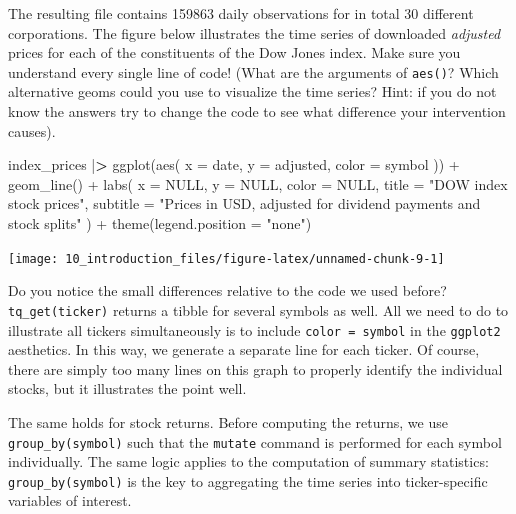 \documentclass[
]{krantz}
\newenvironment{Shaded}{\begin{snugshade}}{\end{snugshade}}
\newcommand{\AttributeTok}[1]{\textcolor[rgb]{0.61,0.61,0.61}{#1}}
\newcommand{\ConstantTok}[1]{\textcolor[rgb]{0,0,0}{#1}}
\newcommand{\ErrorTok}[1]{\textcolor[rgb]{0.14,0.14,0.14}{\textbf{#1}}}
\newcommand{\FunctionTok}[1]{\textcolor[rgb]{0,0,0}{#1}}
\newcommand{\NormalTok}[1]{#1}
\newcommand{\SpecialCharTok}[1]{\textcolor[rgb]{0,0,0}{#1}}
\newcommand{\StringTok}[1]{\textcolor[rgb]{0.5,0.5,0.5}{#1}}
\begin{document}
The resulting file contains 159863 daily observations for in total 30 different corporations. The figure below illustrates the time series of downloaded \emph{adjusted} prices for each of the constituents of the Dow Jones index. Make sure you understand every single line of code! (What are the arguments of \texttt{aes()}? Which alternative geoms could you use to visualize the time series? Hint: if you do not know the answers try to change the code to see what difference your intervention causes).

\begin{Shaded}
\begin{Highlighting}[]
\NormalTok{index\_prices }\SpecialCharTok{|}\ErrorTok{\textgreater{}}
  \FunctionTok{ggplot}\NormalTok{(}\FunctionTok{aes}\NormalTok{(}
    \AttributeTok{x =}\NormalTok{ date,}
    \AttributeTok{y =}\NormalTok{ adjusted,}
    \AttributeTok{color =}\NormalTok{ symbol}
\NormalTok{  )) }\SpecialCharTok{+}
  \FunctionTok{geom\_line}\NormalTok{() }\SpecialCharTok{+}
  \FunctionTok{labs}\NormalTok{(}
    \AttributeTok{x =} \ConstantTok{NULL}\NormalTok{,}
    \AttributeTok{y =} \ConstantTok{NULL}\NormalTok{,}
    \AttributeTok{color =} \ConstantTok{NULL}\NormalTok{,}
    \AttributeTok{title =} \StringTok{"DOW index stock prices"}\NormalTok{,}
    \AttributeTok{subtitle =} \StringTok{"Prices in USD, adjusted for dividend payments and stock splits"}
\NormalTok{  ) }\SpecialCharTok{+}
  \FunctionTok{theme}\NormalTok{(}\AttributeTok{legend.position =} \StringTok{"none"}\NormalTok{)}
\end{Highlighting}
\end{Shaded}

\begin{center}\texttt{[image: 10\_introduction\_files/figure-latex/unnamed-chunk-9-1]} \end{center}

Do you notice the small differences relative to the code we used before? \texttt{tq\_get(ticker)} returns a tibble for several symbols as well. All we need to do to illustrate all tickers simultaneously is to include \texttt{color\ =\ symbol} in the \texttt{ggplot2} aesthetics. In this way, we generate a separate line for each ticker. Of course, there are simply too many lines on this graph to properly identify the individual stocks, but it illustrates the point well.

The same holds for stock returns. Before computing the returns, we use \texttt{group\_by(symbol)} such that the \texttt{mutate} command is performed for each symbol individually. The same logic applies to the computation of summary statistics: \texttt{group\_by(symbol)} is the key to aggregating the time series into ticker-specific variables of interest.
\end{document}
